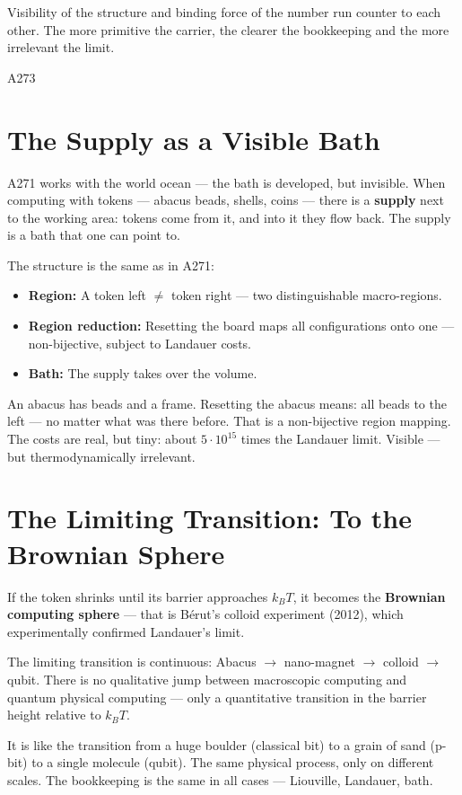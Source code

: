 \label{ch:rechenkugel}

\epigraph{Visibility of the structure and binding force of the number run
counter to each other. The more primitive the carrier, the clearer the bookkeeping
and the more irrelevant the limit.}{A273}

\section{The Supply as a Visible Bath}

A271 works with the world ocean --- the bath is developed, but invisible.
When computing with tokens --- abacus beads, shells, coins --- there is a
\textbf{supply} next to the working area: tokens come from it, and into it
they flow back. The supply is a bath that one can point to.

The structure is the same as in A271: 
\begin{itemize}
  \item \textbf{Region:} A token left $\neq$ token right ---
    two distinguishable macro-regions.
  \item \textbf{Region reduction:} Resetting the board maps all
    configurations onto one --- non-bijective, subject to Landauer costs.
  \item \textbf{Bath:} The supply takes over the volume.
\end{itemize}

\begin{laierspur}
An abacus has beads and a frame. Resetting the abacus means:
all beads to the left --- no matter what was there before. That is a
non-bijective region mapping. The costs are real, but tiny:
about $5 \cdot 10^{15}$ times the Landauer limit. Visible --- but
thermodynamically irrelevant.
\end{laierspur}

\section{The Limiting Transition: To the Brownian Sphere}

If the token shrinks until its barrier approaches $k_BT$, it becomes the
\textbf{Brownian computing sphere} --- that is Bérut's colloid experiment
(2012), which experimentally confirmed Landauer's limit. 

The limiting transition is continuous: Abacus $\to$ nano-magnet $\to$ colloid
$\to$ qubit. There is no qualitative jump between macroscopic
computing and quantum physical computing --- only a quantitative
transition in the barrier height relative to $k_BT$. 

\begin{laierspur}
It is like the transition from a huge boulder (classical bit) to
a grain of sand (p-bit) to a single molecule (qubit). The same
physical process, only on different scales. The bookkeeping
is the same in all cases --- Liouville, Landauer, bath.
\end{laierspur}